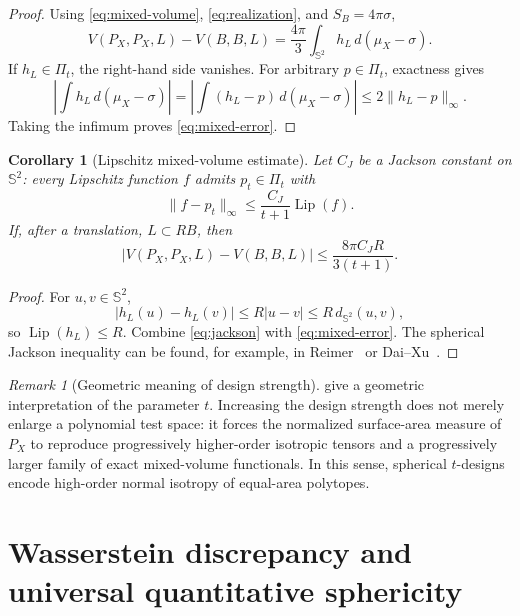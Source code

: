 \documentclass[11pt]{article}
\newtheorem{corollary}[theorem]{Corollary}
\theoremstyle{definition}
\theoremstyle{remark}
\newtheorem{remark}[theorem]{Remark}
\newcommand{\Sph}{\mathbb S}
\newcommand{\Lip}{\operatorname{Lip}}
\begin{document}
\begin{proof}
Using \eqref{eq:mixed-volume}, \eqref{eq:realization}, and $S_B=4\pi\sigma$,
\begin{equation}\label{eq:mixed-difference}
V(P_X,P_X,L)-V(B,B,L)
=\frac{4\pi}{3}\int_{\Sph^2}h_L\,d(\mu_X-\sigma).
\end{equation}
If $h_L\in\Pi_t$, the right-hand side vanishes. For arbitrary $p\in\Pi_t$, exactness gives
\[
\left|\int h_L\,d(\mu_X-\sigma)\right|
=\left|\int(h_L-p)\,d(\mu_X-\sigma)\right|
\le2\|h_L-p\|_\infty.
\]
Taking the infimum proves \eqref{eq:mixed-error}.
\end{proof}

\begin{corollary}[Lipschitz mixed-volume estimate]\label{cor:mixed-lip}
Let $C_J$ be a Jackson constant on $\Sph^2$: every Lipschitz function $f$ admits $p_t\in\Pi_t$ with
\begin{equation}\label{eq:jackson}
\|f-p_t\|_\infty\le\frac{C_J}{t+1}\Lip(f).
\end{equation}
If, after a translation, $L\subset RB$, then
\begin{equation}\label{eq:mixed-lip}
|V(P_X,P_X,L)-V(B,B,L)|\le\frac{8\pi C_JR}{3(t+1)}.
\end{equation}
\end{corollary}

\begin{proof}
For $u,v\in\Sph^2$,
\[
|h_L(u)-h_L(v)|\le R|u-v|\le R\,d_{\Sph^2}(u,v),
\]
so $\Lip(h_L)\le R$. Combine \eqref{eq:jackson} with \eqref{eq:mixed-error}. The spherical Jackson inequality can be found, for example, in Reimer~\cite[Corollary~6.37]{Reimer2003} or Dai--Xu~\cite{DaiXu2013}.
\end{proof}

\begin{remark}[Geometric meaning of design strength]\label{rem:geometric-strength}
 give a geometric interpretation of the parameter $t$. Increasing the design strength does not merely enlarge a polynomial test space: it forces the normalized surface-area measure of $P_X$ to reproduce progressively higher-order isotropic tensors and a progressively larger family of exact mixed-volume functionals. In this sense, spherical $t$-designs encode high-order normal isotropy of equal-area polytopes.
\end{remark}

\section{Wasserstein discrepancy and universal quantitative sphericity}\label{sec:quantitative}
\end{document}
